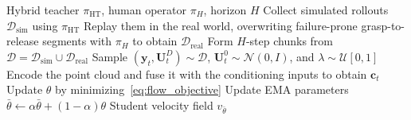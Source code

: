 \begin{algorithm}[t]
  \caption{Offline flow distillation with human intervention}
  \label{alg:method}
  \begin{algorithmic}[1]
    \REQUIRE Hybrid teacher $\pi_{\mathrm{HT}}$, human operator $\pi_H$,
      horizon $H$
    \STATE Collect simulated rollouts $\mathcal D_{\mathrm{sim}}$ using
      $\pi_{\mathrm{HT}}$
    \STATE Replay them in the real world, overwriting failure-prone
      grasp-to-release segments with $\pi_H$ to obtain
      $\mathcal D_{\mathrm{real}}$
    \STATE Form $H$-step chunks from
      $\mathcal D=\mathcal D_{\mathrm{sim}}\cup\mathcal D_{\mathrm{real}}$
    \REPEAT
      \STATE Sample $(\mathbf{y}_t,\mathbf{U}_t^D)\sim\mathcal D$,
        $\mathbf{U}_t^0\sim\mathcal N(0,I)$, and $\lambda\sim\mathcal U[0,1]$
      \STATE Encode the point cloud and fuse it with the conditioning inputs
        to obtain $\mathbf{c}_t$
      \STATE Update $\theta$ by minimizing~\eqref{eq:flow_objective}
      \STATE Update EMA parameters
        $\bar\theta\leftarrow\alpha\bar\theta+(1-\alpha)\theta$
    \RETURN Student velocity field $v_{\bar\theta}$
  \end{algorithmic}
\end{algorithm}

